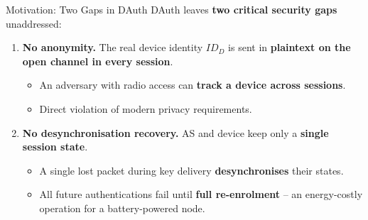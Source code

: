 \begin{frame}{Motivation: Two Gaps in DAuth}
    DAuth leaves \textbf{two critical security gaps} unaddressed:

    \vspace{0.3cm}
    \begin{enumerate}
        \item \textbf{No anonymity.} The real device identity $ID_D$ is sent in
        \textbf{plaintext on the open channel in every session}.
        \begin{itemize}
            \item An adversary with radio access can \textbf{track a device across sessions}.
            \item Direct violation of modern privacy requirements.
        \end{itemize}

        \vspace{0.25cm}
        \item \textbf{No desynchronisation recovery.} AS and device keep only a
        \textbf{single session state}.
        \begin{itemize}
            \item A single lost packet during key delivery \textbf{desynchronises} their states.
            \item All future authentications fail until \textbf{full re-enrolment} --
            an energy-costly operation for a battery-powered node.
        \end{itemize}
    \end{enumerate}
\end{frame}

